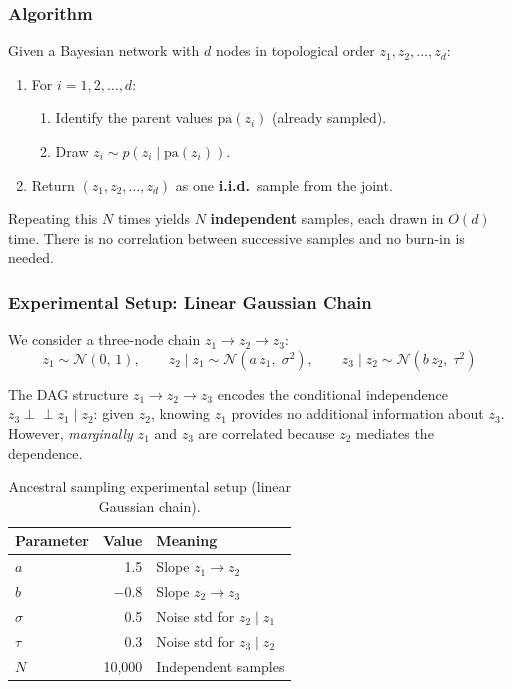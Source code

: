 \documentclass[12pt, a4paper]{article}
\begin{document}
\subsubsection{Algorithm}

Given a Bayesian network with $d$ nodes in topological order
$z_1, z_2, \ldots, z_d$:

\begin{enumerate}
    \item For $i = 1, 2, \ldots, d$:
    \begin{enumerate}
        \item Identify the parent values
              $\mathrm{pa}(z_i)$ (already sampled).
        \item Draw $z_i \sim p\!\left(z_i \mid \mathrm{pa}(z_i)\right)$.
    \end{enumerate}
    \item Return $(z_1, z_2, \ldots, z_d)$ as one \textbf{i.i.d.}\ sample
          from the joint.
\end{enumerate}

Repeating this $N$ times yields $N$ \textbf{independent} samples,
each drawn in $O(d)$ time.  There is no correlation between
successive samples and no burn-in is needed.

\subsubsection{Experimental Setup: Linear Gaussian Chain}

We consider a three-node chain
$z_1 \to z_2 \to z_3$:
\begin{equation}
    z_1 \sim \mathcal{N}(0,\, 1),\qquad
    z_2 \mid z_1 \sim \mathcal{N}(a\,z_1,\; \sigma^2),\qquad
    z_3 \mid z_2 \sim \mathcal{N}(b\,z_2,\; \tau^2)
    \label{eq:ancestral_chain}
\end{equation}

The DAG structure $z_1 \to z_2 \to z_3$ encodes the conditional
independence $z_3 \perp\!\!\perp z_1 \mid z_2$: given $z_2$,
knowing $z_1$ provides no additional information about $z_3$.
However, \emph{marginally} $z_1$ and $z_3$ are correlated
because $z_2$ mediates the dependence.

\begin{table}[H]
    \centering
    \begin{tabular}{lrl}
        \toprule
        \textbf{Parameter} & \textbf{Value}
            & \textbf{Meaning} \\
        \midrule
        $a$      & 1.5   & Slope $z_1 \to z_2$ \\
        $b$      & $-0.8$ & Slope $z_2 \to z_3$ \\
        $\sigma$ & 0.5   & Noise std for $z_2 \mid z_1$ \\
        $\tau$   & 0.3   & Noise std for $z_3 \mid z_2$ \\
        $N$      & 10{,}000 & Independent samples \\
        \bottomrule
    \end{tabular}
    \caption{Ancestral sampling experimental setup
             (linear Gaussian chain).}
    \label{tab:ancestral_setup}
\end{table}
\end{document}
